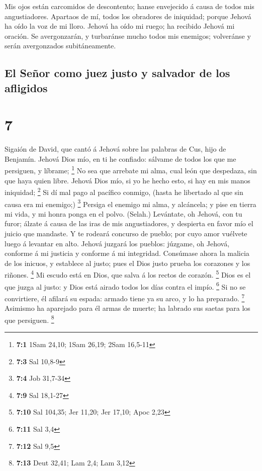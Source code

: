  Mis ojos están carcomidos de descontento; hanse envejecido
á causa de todos mis angustiadores.  Apartaos de mí, todos
los obradores de iniquidad; porque Jehová ha oído la voz de mi lloro.
 Jehová ha oído mi ruego; ha recibido Jehová mi oración.
 Se avergonzarán, y turbaránse mucho todos mis enemigos;
volveránse y serán avergonzados subitáneamente.

\hypertarget{el-seuxf1or-como-juez-justo-y-salvador-de-los-afligidos}{%
\subsection{El Señor como juez justo y salvador de los
afligidos}\label{el-seuxf1or-como-juez-justo-y-salvador-de-los-afligidos}}

\hypertarget{section-6}{%
\section{7}\label{section-6}}

 Sigaión de David, que cantó á Jehová sobre las palabras de
Cus, hijo de Benjamín. Jehová Dios mío, en ti he confiado: sálvame de
todos los que me persiguen, y líbrame; \footnote{\textbf{7:1} 1Sam
  24,10; 1Sam 26,19; 2Sam 16,5-11}  No sea que arrebate mi
alma, cual león que despedaza, sin que haya quien libre. 
Jehová Dios mío, si yo he hecho esto, si hay en mis manos iniquidad;
\footnote{\textbf{7:3} Sal 10,8-9}  Si dí mal pago al
pacífico conmigo, (hasta he libertado al que sin causa era mi enemigo;)
\footnote{\textbf{7:4} Job 31,7-34}  Persiga el enemigo mi
alma, y alcáncela; y pise en tierra mi vida, y mi honra ponga en el
polvo. (Selah.)  Levántate, oh Jehová, con tu furor; álzate
á causa de las iras de mis angustiadores, y despierta en favor mío el
juicio que mandaste.  Y te rodeará concurso de pueblo; por
cuyo amor vuélvete luego á levantar en alto.  Jehová juzgará
los pueblos: júzgame, oh Jehová, conforme á mi justicia y conforme á mi
integridad.  Consúmase ahora la malicia de los inicuos, y
establece al justo; pues el Dios justo prueba los corazones y los
riñones. \footnote{\textbf{7:9} Sal 18,1-27}  Mi escudo
está en Dios, que salva á los rectos de corazón. \footnote{\textbf{7:10}
  Sal 104,35; Jer 11,20; Jer 17,10; Apoc 2,23}  Dios es el
que juzga al justo: y Dios está airado todos los días contra el impío.
\footnote{\textbf{7:11} Sal 3,4}  Si no se convirtiere, él
afilará su espada: armado tiene ya su arco, y lo ha preparado.
\footnote{\textbf{7:12} Sal 9,5}  Asimismo ha aparejado
para él armas de muerte; ha labrado sus saetas para los que persiguen.
\footnote{\textbf{7:13} Deut 32,41; Lam 2,4; Lam 3,12}

